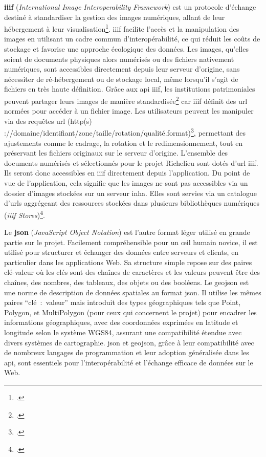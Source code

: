 \textbf{\acrshort{iiif}} (\textit{International Image Interoperability Framework}) est un protocole d'échange destiné à standardiser la gestion des images numériques, allant de leur hébergement à leur visualisation\footcite{ROBINEAUComprendre2016}. \acrshort{iiif} facilite l'accès et la manipulation des images en utilisant un cadre commun d'interopérabilité, ce qui réduit les coûts de stockage et favorise une approche écologique des données. Les images, qu'elles soient de documents physiques alors numérisés ou des fichiers nativement numériques, sont accessibles directement depuis leur serveur d'origine, sans nécessiter de ré-hébergement ou de stockage local, même lorsqu'il s'agit de fichiers en très haute définition. Grâce aux \acrshort{api} \acrshort{iiif}, les institutions patrimoniales peuvent partager leurs images de manière standardisée\footcite{INHAbibliotheques2019} car \acrshort{iiif} définit des \acrshort{url} normées pour accéder à un fichier image. Les utilisateurs peuvent les manipuler via des requêtes \acrshort{url} (http(s) ://{domaine}/{identifiant}/{zone}/{taille}/{rotation}/{qualité}.{format})\footcite{FAUREstandard2022}, permettant des ajustements comme le cadrage, la rotation et le redimensionnement, tout en préservant les fichiers originaux sur le serveur d'origine. L'ensemble des documents numérisés et sélectionnés pour le projet Richelieu sont dotés d'\acrshort{url} \acrshort{iiif}. Ils seront donc accessibles en \acrshort{iiif} directement depuis l'application. Du point de vue de l'application, cela signifie que les images ne sont pas accessibles via un dossier d'images stockées sur un serveur \acrshort{inha}. Elles sont servies via un catalogue d'\acrshort{url}s aggrégeant des ressources stockées dans plusieurs bibliothèques numériques (\textit{\acrshort{iiif} Stores})\footcite{INHAbibliotheques2019}.

Le \textbf{\acrshort{json}} (\textit{JavaScript Object Notation}) est l'autre format léger utilisé en grande partie sur le projet. Facilement compréhensible pour un œil humain novice, il est utilisé pour structurer et échanger des données entre serveurs et clients, en particulier dans les applications Web. Sa structure simple repose sur des paires clé-valeur où les clés sont des chaînes de caractères et les valeurs peuvent être des chaînes, des nombres, des tableaux, des objets ou des booléens. Le \acrshort{geojson} est une norme de description de données spatiales au format \acrshort{json}. Il utilise les mêmes paires \enquote{clé~:~valeur} mais introduit des types géographiques tels que Point, Polygon, et MultiPolygon (pour ceux qui concernent le projet) pour encadrer les informations géographiques, avec des coordonnées exprimées en latitude et longitude selon le système WGS84, assurant une compatibilité étendue avec divers systèmes de cartographie. \acrshort{json} et \acrshort{geojson}, grâce à leur compatibilité avec de nombreux langages de programmation et leur adoption généralisée dans les \acrshort{api}, sont essentiels pour l’interopérabilité et l’échange efficace de données sur le Web.

